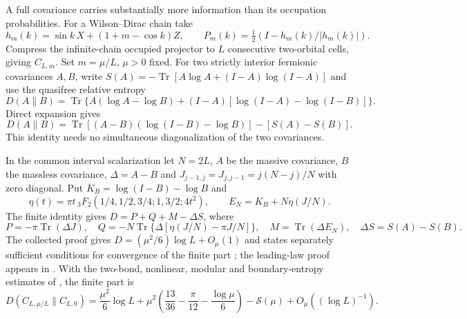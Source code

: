 \documentclass[11pt,letterpaper]{article}
\newcommand{\tr}{\operatorname{Tr}}\newcommand{\TV}{\operatorname{TV}}\newcommand{\E}{\mathbb E}\newcommand{\id}{\mathbb I}\newcommand{\calB}{\mathcal B}\newcommand{\norm}[1]{\left\lVert#1\right\rVert}
\begin{document}
A full covariance carries substantially more information than its occupation probabilities. For a Wilson–Dirac chain take
\[
 h_m(k)=\sin k\,X+(1+m-\cos k)Z,\qquad P_m(k)=\tfrac12(I-h_m(k)/|h_m(k)|).
\]
Compress the infinite-chain occupied projector to $L$ consecutive two-orbital cells, giving $C_{L,m}$. Set $m=\mu/L$, $\mu>0$ fixed. For two strictly interior fermionic covariances $A,B$, write $S(A)=-\tr[A\log A+(I-A)\log(I-A)]$ and use the quasifree relative entropy
\[
 D(A\|B)=\tr\{A(\log A-\log B)+(I-A)[\log(I-A)-\log(I-B)]\}.
\] Direct expansion gives
\[
 D(A\|B)=\tr[(A-B)(\log(I-B)-\log B)]-[S(A)-S(B)] .
\]
This identity needs no simultaneous diagonalization of the two covariances.

\begin{proposition}\label{prop:wilson}
In the common interval scalarization let $N=2L$, $A$ be the massive covariance, $B$ the massless covariance, $\Delta=A-B$ and $J_{j-1,j}=J_{j,j-1}=j(N-j)/N$ with zero diagonal. Put $K_B=\log(I-B)-\log B$ and
\[
 \eta(t)=\pi t\,{}_3F_2(1/4,1/2,3/4;1,3/2;4t^2),\qquad E_N=K_B+N\eta(J/N).
\]
The finite identity gives $D=P+Q+M-\Delta S$, where
\[
 P=-\pi\tr(\Delta J),\quad Q=-N\tr\{\Delta[\eta(J/N)-\pi J/N]\},\quad
 M=\tr(\Delta E_N),\quad \Delta S=S(A)-S(B).
\]
The collected proof gives $D=(\mu^2/6)\log L+O_\mu(1)$ and states separately sufficient conditions for convergence of the finite part \cite{relative}; the leading-law proof appears in \cite{bulk}. With the two-bond, nonlinear, modular and boundary-entropy estimates of \cite[Secs.~2--7]{justuswilson}, the finite part is
\[
 D(C_{L,\mu/L}\|C_{L,0})
 =\frac{\mu^2}{6}\log L+
 \mu^2\!\left(\frac{13}{36}-\frac{\pi}{12}-\frac{\log\mu}{6}\right)
 -\mathcal S(\mu)+O_\mu((\log L)^{-1}).
\]
\end{proposition}
\end{document}
